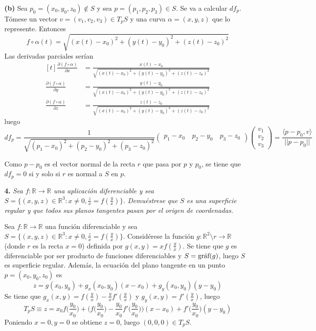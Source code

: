 \documentclass[12pt]{report}
\newcommand{\R}{\mathbb R}
\begin{document}
\vspace{2mm}
\textbf{(b) }
Sea $p_0 = (x_0,y_0,z_0) \notin S$ y sea $p = (p_1,p_2,p_3) \in S$. Se va a calcular $df_p$. Tómese un vector $v = (v_1,v_2,v_3) \in T_pS$ y una curva $\alpha = (x,y,z)$ que lo represente. Entonces
\[f \circ \alpha(t) = \sqrt{(x(t)-x_0)^2+(y(t)-y_0)^2+(z(t)-z_0)^2}\]
Las derivadas parciales serían
\[
\begin{aligned}[t]
\frac{\partial (f \circ \alpha)}{\partial x} &= \frac{x(t)-x_0}{\sqrt{(x(t)-x_0)^2+(y(t)-y_0)^2+(z(t)-z_0)^2}} \\
\frac{\partial (f \circ \alpha)}{\partial y} &=\frac{y(t)-y_0}{\sqrt{(x(t)-x_0)^2+(y(t)-y_0)^2+(z(t)-z_0)^2}} \\
\frac{\partial (f \circ \alpha)}{\partial z} &=\frac{z(t)-z_0}{\sqrt{(x(t)-x_0)^2+(y(t)-y_0)^2+(z(t)-z_0)^2}}
\end{aligned}
\]
luego
\[df_p = \frac{1}{\sqrt{(p_1-x_0)^2+(p_2-y_0)^2+(p_3-z_0)^2}} \begin{pmatrix}
    p_1-x_0 \ & p_2-y_0  \ & p_3-z_0
\end{pmatrix} \begin{pmatrix}
    v_1 \\
    v_2 \\
    v_3
\end{pmatrix} = \frac{\langle p-p_0,v \rangle}{||p-p_0||}\]

Como $p-p_0$ es el vector normal de la recta $r$ que pasa por $p$ y $p_0$, se tiene que $df_p = 0$ si y solo si $r$ es normal a $S$ en $p$.

\vspace{4mm}
\textbf{4. } \textit{Sea $f \colon \R \to \R$ una aplicación diferenciable y sea $S = \{(x,y,z) \in \R^3 \colon x \neq 0, \frac{z}{x} = f(\frac{y}{x})\}$. Demuéstrese que $S$ es una superficie regular y que todos sus planos tangentes pasan por el origen de coordenadas.}

\vspace{2mm}
Sea $f \colon \R \to \R$ una función diferenciable y sea $S = \{(x,y,z) \in \R^3 \colon x \neq 0, \frac{z}{x} = f(\frac{y}{x})\}$. Considérese la función $g \colon \R^2 \setminus r \to \R$ (donde $r$ es la recta $x = 0$) definida por $g(x,y) = xf(\frac{y}{x})$. Se tiene que $g$ es diferenciable por ser producto de funciones diferenciables y $S = \textup{gráf}(g)$, luego $S$ es superficie regular. Además, la ecuación del plano tangente en un punto $p = (x_0,y_0,z_0)$ es
\[z = g(x_0,y_0) + g_x(x_0,y_0)(x-x_0)+g_y(x_0,y_0)(y-y_0)\]
Se tiene que $g_x(x,y) = f(\frac{y}{x})-\frac{y}{x}f'(\frac{y}{x})$ y $g_y(x,y) = f'(\frac{y}{x})$, luego
\[T_pS \equiv z = x_0f\biggl(\frac{y_0}{x_0}\biggr)+\biggl(f\biggl(\frac{y_0}{x_0}\biggr)-\frac{y_0}{x_0}f'\biggl(\frac{y_0}{x_0}\biggr)\biggr)(x-x_0)+f'\biggl(\frac{y_0}{x_0}\biggr)(y-y_0)\]
Poniendo $x = 0, y = 0$ se obtiene $z = 0$, luego $(0,0,0) \in T_pS$.
\end{document}
